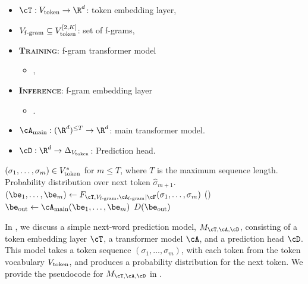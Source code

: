 {\renewcommand{\baselinestretch}{1.35}\selectfont
\begin{algorithm}[h]
\caption{Next-word prediction with \SCONE  $M_{\cT, \Vfgram, \train{\Afgram}|\infer{\cF}, \Amain, \cD}$}
\label{alg:scone-model}
\begin{algorithmic}
\begin{itemize}[itemsep=-3pt]
    \item $\cT : \Vtoken \to \R^d$: token embedding layer,
    \item $V_{\mathrm{f\text{-}gram}} \subseteq V_{\mathrm{token}}^{[2,K]}$: set of f-grams,
    \item \textbf{\textsc{Training}}: f-gram transformer model
    \begin{itemize}[leftmargin=8mm,label=$\triangleright$,itemsep=-3pt,topsep=-4pt]
        \item {},
    \end{itemize}
    \item \textbf{\textsc{Inference}}: f-gram embedding layer
    \begin{itemize}[leftmargin=8mm,label=$\triangleright$,itemsep=-3pt,topsep=-4pt]
        \item {}.
    \end{itemize}
    \item $\Amain : (\R^d)^{\le T} \to \R^d$: main transformer model.
    \item $\cD : \R^d \to \Delta_{\Vtoken}$: Prediction head.
\end{itemize}
 $(\sigma_1, \ldots, \sigma_m) \in V_{\mathrm{token}}^*$ for $m \le T$, where $T$ is the maximum sequence length.
 Probability distribution over next token $\hat{\sigma}_{m+1}$.
\STATE $(\be_1, \ldots, \be_m) \gets F_{\cT, \Vfgram, \train{\Afgram} | \infer{\cF}}(\sigma_1, \ldots, \sigma_m)$ ()
\STATE $\be_{\mathrm{out}} \gets \Amain(\be_1, \ldots, \be_m)$
\RETURN $D(\be_{\mathrm{out}})$
\end{algorithmic}
\end{algorithm}
}

In , we discuss a simple next-word prediction model, \( M_{\cT, \cA, \cD} \), consisting of a token embedding layer \( \cT \), a transformer model \( \cA \), and a prediction head \( \cD \). This model takes a token sequence \( (\sigma_1, \ldots, \sigma_m) \), with each token from the token vocabulary \( V_{\mathrm{token}} \), and produces a probability distribution for the next token. We provide the pseudocode for \( M_{\cT, \cA, \cD} \) in .

